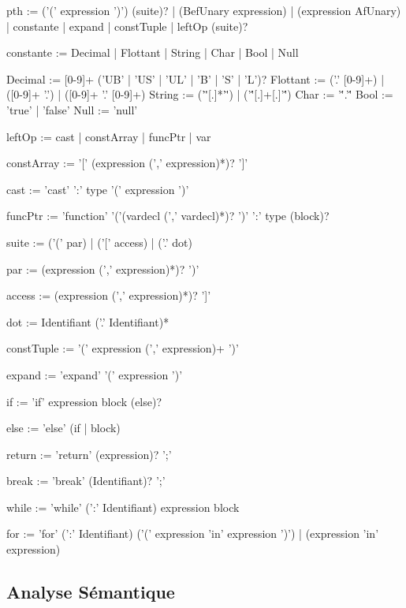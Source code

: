 \documentclass[a4paper, 11pt]{article}
\begin{document}
\begin {boxedverbatim}
  pth := ('(' expression ')') (suite)?
         | (BefUnary expression)
         | (expression AfUnary)
         | constante
         | expand
         | constTuple
         | leftOp (suite)?

  constante := Decimal | Flottant | String | Char | Bool | Null

  Decimal := [0-9]+ ('UB' | 'US' | 'UL' | 'B' | 'S' | 'L')?
  Flottant := ('.' [0-9]+) | ([0-9]+ '.') | ([0-9]+ '.' [0-9]+)
  String := ('\"'[.]*'\"') | ('\''[.]+[.]'\'')
  Char := '\''.'\''
  Bool := 'true' | 'false'
  Null := 'null'

  leftOp := cast | constArray | funcPtr | var

  constArray := '[' (expression (',' expression)*)? ']'

  cast := 'cast' ':' type '(' expression ')'

  funcPtr := 'function' '('(vardecl (',' vardecl)*)? ')' ':' type (block)?

  suite := ('(' par) | ('[' access) | ('.' dot)

  par := (expression (',' expression)*)? ')'

  access := (expression (',' expression)*)? ']'

  dot := Identifiant ('.' Identifiant)*

  constTuple := '(' expression (',' expression)+ ')'
  
  expand := 'expand' '(' expression ')'

  if := 'if' expression block (else)?

  else := 'else' (if | block) 

  return := 'return' (expression)? ';'

  break := 'break' (Identifiant)? ';'
   
\end{boxedverbatim}
\pagebreak

\begin {boxedverbatim}
  while := 'while' (':' Identifiant) expression block

  for := 'for' (':' Identifiant) ('(' expression 'in' expression ')')
                                 | (expression 'in' expression)
                                 
\end{boxedverbatim}

\subsection {Analyse Sémantique}
\end{document}
